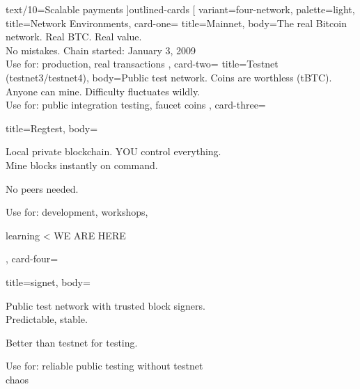 \documentclass[aspectratio=169]{beamer}
\begin{document}
  text/10={Scalable payments}
]{outlined-cards}
\gdef\studiocataloguename{\detokenize{five-icon-row}}
\gdef\studiocataloguename{\detokenize{square-icon-grid}}
\gdef\studiocataloguename{\detokenize{incentives-card-grid}}
\gdef\studiocataloguename{\detokenize{network-environments}}
\studiotemplate[
  variant={four-network},
  palette={light},
  title={Network Environments},
  card-one={
    title={Mainnet},
    body={The real Bitcoin network. Real BTC. Real value.\\No mistakes. Chain started: January 3, 2009\\Use for: production, real transactions}
  },
  card-two={
    title={Testnet (testnet3/testnet4)},
    body={Public test network. Coins are worthless (tBTC).\\Anyone can mine. Difficulty fluctuates wildly.\\Use for: public integration testing, faucet coins}
  },
  card-three={
    title={Regtest},
    body={Local private blockchain. YOU control everything.\\Mine blocks instantly on command.\par No peers needed.\par Use for: development, workshops,\par learning < WE ARE HERE}
  },
  card-four={
    title={signet},
    body={Public test network with trusted block signers.\\Predictable, stable.\par Better than testnet for testing.\par Use for: reliable public testing without testnet\\chaos}
  }
\end{document}
